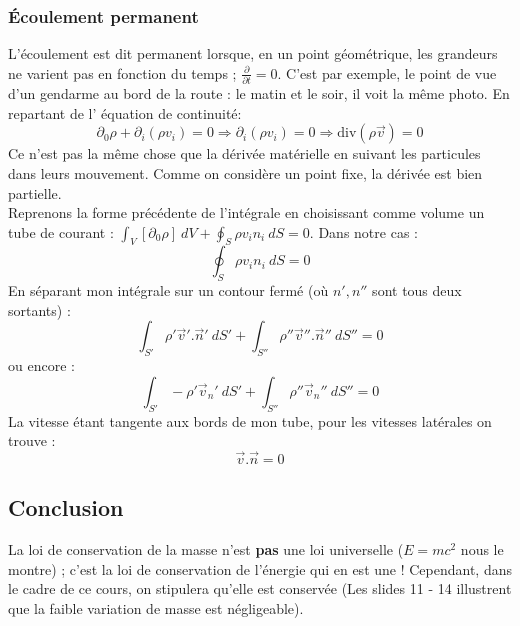 \subsubsection{Écoulement permanent}
L'écoulement est dit permanent lorsque, en un point géométrique, les grandeurs ne varient pas en
fonction du temps ; $\frac{\partial}{\partial t} = 0$. C'est par exemple, le point de vue d'un 
gendarme au bord de la route : le matin et le soir, il voit la même photo. En repartant de l'
équation de continuité:
\begin{equation}
	\partial_0\rho + \partial_i(\rho v_i) = 0 \Rightarrow \partial_i(\rho v_i) = 0 \Rightarrow
	\text{div}(\rho\vec v) = 0
\end{equation}
Ce n'est pas la même chose que la dérivée matérielle en suivant les particules dans leurs 
mouvement. Comme on considère un point fixe, la dérivée est bien partielle.\\
        
Reprenons la forme précédente de l'intégrale en choisissant comme volume un tube de courant : $
\int_V [\partial_0\rho]\ dV + \oint_S \rho v_in_i\ dS = 0$. Dans notre cas :
\begin{equation}
	\oint_S \rho v_in_i\ dS = 0
\end{equation}
En séparant mon intégrale sur un contour fermé (où $n',n''$ sont tous deux sortants) :
\begin{equation}
	\int_{S'} \rho'\vec v'.\vec n'\ dS' + \int_{S''} \rho''\vec v''.\vec n''\ dS'' = 0
\end{equation}
ou encore :
\begin{equation}
	\int_{S'} -\rho'\vec v_n'\ dS' + \int_{S''} \rho''\vec v_n''\ dS'' = 0
\end{equation}
La vitesse étant tangente aux bords de mon tube, pour les vitesses latérales on trouve : 
\begin{equation}
	\vec v.\vec n =0
\end{equation}
        
        
\subsection{Conclusion}
La loi de conservation de la masse n'est \textbf{pas} une loi universelle ($E = mc^2$ nous le
montre) ; c'est la loi de conservation de l'énergie qui en est une ! Cependant, dans le cadre
de ce cours, on stipulera qu'elle est conservée (Les slides 11 - 14 illustrent que la faible
variation de masse est négligeable).
    
